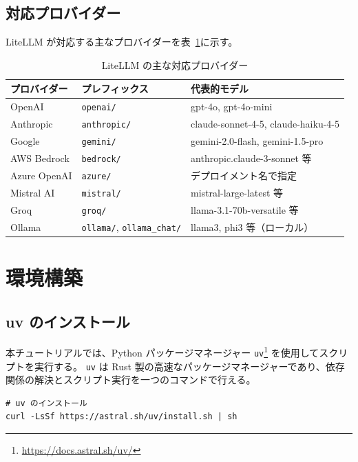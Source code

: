 \documentclass[a4paper,11pt]{ltjsarticle}
\newcommand{\code}[1]{\texttt{#1}}
\begin{document}
\subsection{対応プロバイダー}

LiteLLM が対応する主なプロバイダーを表~\ref{tab:providers}に示す。

\begin{table}[htbp]
\centering
\caption{LiteLLM の主な対応プロバイダー}
\label{tab:providers}
\begin{tabular}{llp{6cm}}
\toprule
プロバイダー & プレフィックス & 代表的モデル \\
\midrule
OpenAI       & \code{openai/}    & gpt-4o, gpt-4o-mini \\
Anthropic    & \code{anthropic/} & claude-sonnet-4-5, claude-haiku-4-5 \\
Google       & \code{gemini/}    & gemini-2.0-flash, gemini-1.5-pro \\
AWS Bedrock  & \code{bedrock/}   & anthropic.claude-3-sonnet 等 \\
Azure OpenAI & \code{azure/}     & デプロイメント名で指定 \\
Mistral AI   & \code{mistral/}   & mistral-large-latest 等 \\
Groq         & \code{groq/}      & llama-3.1-70b-versatile 等 \\
Ollama       & \code{ollama/}, \code{ollama\_chat/} & llama3, phi3 等（ローカル） \\
\bottomrule
\end{tabular}
\end{table}


\section{環境構築}
\label{sec:setup}

\subsection{uv のインストール}

本チュートリアルでは、Python パッケージマネージャー \code{uv}\footnote{\url{https://docs.astral.sh/uv/}} を使用してスクリプトを実行する。
\code{uv} は Rust 製の高速なパッケージマネージャーであり、依存関係の解決とスクリプト実行を一つのコマンドで行える。

\begin{lstlisting}[style=bash]
# uv のインストール
curl -LsSf https://astral.sh/uv/install.sh | sh
\end{lstlisting}
\end{document}
